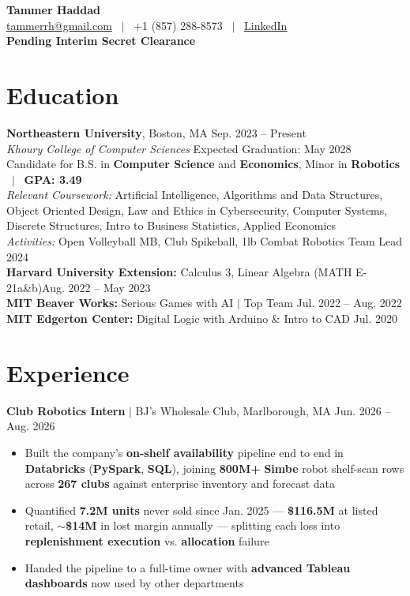 \documentclass[11pt,letterpaper]{article}
\begin{document}
\begin{center}
    {\LARGE\bfseries Tammer Haddad}\\[3pt]
    \href{mailto:tammerrh@gmail.com}{tammerrh@gmail.com} \, $|$ \, +1 (857) 288-8573 \, $|$ \, \href{https://linkedin.com/in/tammerhaddad}{\underline{\textcolor{linkedinblue}{LinkedIn}}}\\[1pt]
    \textbf{Pending Interim Secret Clearance}\\[1pt]
\end{center}

\section{Education}

\textbf{Northeastern University}, Boston, MA \hfill Sep. 2023 -- Present\\
\textit{Khoury College of Computer Sciences} \hfill Expected Graduation: May 2028\\
Candidate for B.S. in \textbf{Computer Science} and \textbf{Economics}, Minor in \textbf{Robotics} \, $|$ \, \textbf{GPA: 3.49}\\
\textit{Relevant Coursework:} Artificial Intelligence, Algorithms and Data Structures, Object Oriented Design, Law and Ethics in Cybersecurity, Computer Systems, Discrete Structures, Intro to Business Statistics, Applied Economics\\
\textit{Activities:} Open Volleyball MB, Club Spikeball, 1lb Combat Robotics Team Lead 2024\\[4pt]
\textbf{Harvard University Extension:} Calculus 3, Linear Algebra (MATH E-21a\&b)\hfill Aug. 2022 -- May 2023\\
\textbf{MIT Beaver Works:} Serious Games with AI $|$ Top Team \hfill Jul. 2022 -- Aug. 2022\\
\textbf{MIT Edgerton Center:} Digital Logic with Arduino \& Intro to CAD \hfill Jul. 2020

\section{Experience}

\textbf{Club Robotics Intern} $|$ BJ's Wholesale Club, Marlborough, MA \hfill Jun. 2026 -- Aug. 2026
\begin{itemize}
    \item Built the company's \textbf{on-shelf availability} pipeline end to end in \textbf{Databricks} (\textbf{PySpark}, \textbf{SQL}), joining \textbf{800M+} \textbf{Simbe} robot shelf-scan rows across \textbf{267 clubs} against enterprise inventory and forecast data
    \item Quantified \textbf{7.2M units} never sold since Jan. 2025 --- \textbf{\$116.5M} at listed retail, \textbf{$\sim$\$14M} in lost margin annually --- splitting each loss into \textbf{replenishment execution} vs. \textbf{allocation} failure
    \item Handed the pipeline to a full-time owner with \textbf{advanced Tableau dashboards} now used by other departments
\end{itemize}
\end{document}

